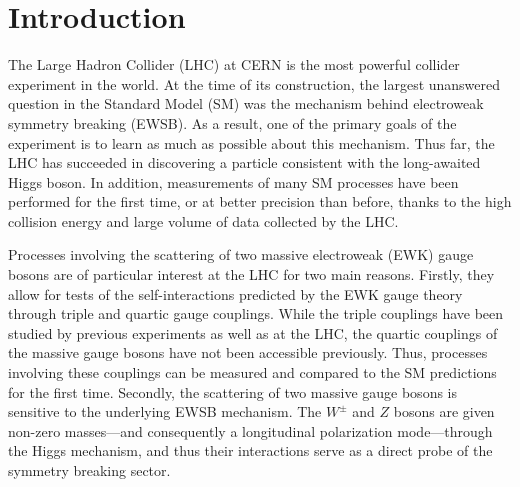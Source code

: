 \chapter[Introduction][Introduction]{Introduction}
The Large Hadron Collider (LHC) at CERN is the most powerful collider experiment in the world.
At the time of its construction, the largest unanswered question in the Standard Model (SM) was the mechanism behind electroweak symmetry breaking (EWSB).
As a result, one of the primary goals of the experiment is to learn as much as possible about this mechanism.
Thus far, the LHC has succeeded in discovering a particle consistent with the long-awaited Higgs boson. %
In addition, measurements of many SM processes have been performed for the first time, or at better precision than before, thanks to the high collision energy and large volume of data collected by the LHC.

Processes involving the scattering of two massive electroweak (EWK) gauge bosons are of particular interest at the LHC for two main reasons.
Firstly, they allow for tests of the self-interactions predicted by the EWK gauge theory through triple and quartic gauge couplings.
While the triple couplings have been studied by previous experiments as well as at the LHC, the quartic couplings of the massive gauge bosons have not been accessible previously.
Thus, processes involving these couplings can be measured and compared to the SM predictions for the first time.
Secondly, the scattering of two massive gauge bosons is sensitive to the underlying EWSB mechanism.
The $W^{\pm}$ and $Z$ bosons are given non-zero masses---and consequently a longitudinal polarization mode---through the Higgs mechanism, and thus their interactions serve as a direct probe of the symmetry breaking sector.

